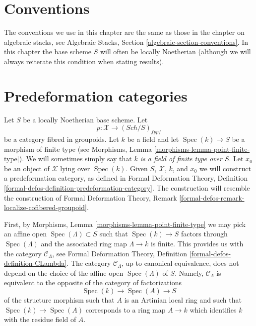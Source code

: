 \documentclass{stacks-project}
\theoremstyle{plain}
\theoremstyle{definition}
\theoremstyle{remark}
\numberwithin{equation}{subsection}
\def\Spec{\mathop{\mathrm{Spec}}}
\def\Sch{\mathit{Sch}}
\begin{document}
\section{Conventions}
\label{section-conventions}

\noindent
The conventions we use in this chapter are the same as those in the
chapter on algebraic stacks, see
Algebraic Stacks, Section \ref{algebraic-section-conventions}.
In this chapter the base scheme $S$ will often be locally Noetherian
(although we will always reiterate this condition when stating
results).





\section{Predeformation categories}
\label{section-predeformation-categories}

\noindent
Let $S$ be a locally Noetherian base scheme. Let
$$
p : \mathcal{X} \longrightarrow (\Sch/S)_{fppf}
$$
be a category fibred in groupoids. Let $k$ be a field
and let $\Spec(k) \to S$ be a morphism of finite type (see
Morphisms, Lemma \ref{morphisms-lemma-point-finite-type}). We will sometimes
simply say that {\it $k$ is a field of finite type over $S$}. Let
$x_0$ be an object of $\mathcal{X}$ lying over $\Spec(k)$.
Given $S$, $\mathcal{X}$, $k$, and $x_0$ we will construct a
predeformation category, as defined in
Formal Deformation Theory,
Definition \ref{formal-defos-definition-predeformation-category}.
The construction will resemble the construction of
Formal Deformation Theory,
Remark \ref{formal-defos-remark-localize-cofibered-groupoid}.

\medskip\noindent
First, by Morphisms, Lemma \ref{morphisms-lemma-point-finite-type}
we may pick an affine open $\Spec(\Lambda) \subset S$ such that
$\Spec(k) \to S$ factors through $\Spec(\Lambda)$ and the associated
ring map $\Lambda \to k$ is finite. This provides us with the category
$\mathcal{C}_\Lambda$, see
Formal Deformation Theory, Definition \ref{formal-defos-definition-CLambda}.
The category $\mathcal{C}_\Lambda$, up to canonical equivalence,
does not depend on the choice of the affine open $\Spec(\Lambda)$ of $S$.
Namely, $\mathcal{C}_\Lambda$ is equivalent to the opposite
of the category of factorizations
\begin{equation}
\label{equation-factor}
\Spec(k) \to \Spec(A) \to S
\end{equation}
of the structure morphism such that $A$ is an Artinian local ring and
such that $\Spec(k) \to \Spec(A)$ corresponds to a ring map $A \to k$ which
identifies $k$ with the residue field of $A$.
\end{document}
